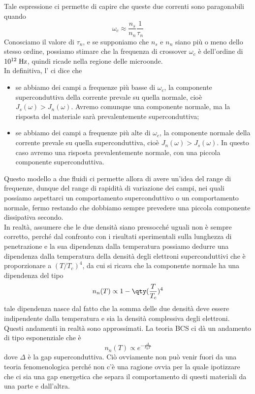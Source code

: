 Tale espressione ci permette di capire che queste due correnti sono paragonabili quando
\begin{equation*}
   \omega_c
   \approx \frac{n_s}{n_n} \frac{1}{\tau_n}
\end{equation*}
Conosciamo il valore di $\tau_n$, e se supponiamo che $n_s$ e $n_n$ siano più o meno dello stesso ordine, possiamo stimare che la frequenza di crossover $\omega_c$ è dell'ordine di $10^{12} \; \rm Hz$, quindi ricade nella regione delle microonde.\\
In definitiva, l' ci dice che
\begin{itemize}[leftmargin=0.5cm]
   \item se abbiamo dei campi a frequenze più basse di $\omega_c$, la componente superconduttiva della corrente prevale su quella normale, cioè $J_s(\omega)>J_n(\omega)$. Avremo comunque una componente normale, ma la risposta del materiale sarà prevalentemente superconduttiva;
   \item se abbiamo dei campi a frequenze più alte di $\omega_c$, la componente normale della corrente prevale su quella superconduttiva, cioè $J_n(\omega)>J_s(\omega)$. In questo caso avremo una risposta prevalentemente normale, con una piccola componente superconduttiva.
\end{itemize}
Questo modello a due fluidi ci permette allora di avere un'idea del range di frequenze, dunque del range di rapidità di variazione dei campi, nei quali possiamo aspettarci un comportamento superconduttivo o un comportamento normale, fermo restando che dobbiamo sempre prevedere una piccola componente dissipativa secondo.\\
In realtà, assumere che le due densità siano pressocché uguali non è sempre corretto, perché dal confronto con i risultati sperimentali sulla lunghezza di penetrazione e la sua dipendenza dalla temperatura possiamo dedurre una dipendenza dalla temperatura della densità degli elettroni superconduttivi che è proporzionare a $(T/T_c)^4$, da cui si ricava che la componente normale ha una dipendenza del tipo
\begin{equation*}
   n_n(T)
   \propto 1 - \qty(\frac{T}{T_c})^4
\end{equation*}
tale dipendenza nasce dal fatto che la somma delle due densità deve essere indipendente dalla temperatura e sia la densità complessiva degli elettroni.\\
Questi andamenti in realtà sono approssimati. La teoria BCS ci dà un andamento di tipo esponenziale che è
\begin{equation*}
   n_n(T)
   \propto e^{-\frac{\Delta}{k_B T}}
\end{equation*}
dove $\Delta$ è la gap superconduttiva. Ciò ovviamente non può venir fuori da una teoria fenomenologica perché non c'è una ragione ovvia per la quale ipotizzare che ci sia una gap energetica che separa il comportamento di questi materiali da una parte e dall'altra.

